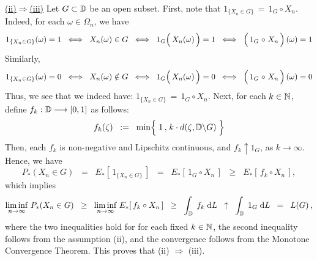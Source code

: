 \vskip 0.5cm \noindent
\underline{(ii)\;$\Longrightarrow$\;(iii)}
\vskip 0.2cm \noindent
Let $G \subset \mathbb{D}$ be an open subset.
First, note that $1_{\{X_{n} \in G\}} \,=\, 1_{G} \circ X_{n}$.
Indeed, for each $\omega \in \Omega_{n}$, we have
\begin{equation*}
1_{\{X_{n} \in G\}}(\omega) = 1
\;\;\Longleftrightarrow\;\; X_{n}(\omega) \in G
\;\;\Longleftrightarrow\;\; 1_{G}\!\left(\,X_{n}(\overset{{\color{white}-}}{\omega})\,\right) = 1
\;\;\Longleftrightarrow\;\; \left(\,1_{G} \overset{{\color{white}-}}{\circ} X_{n}\,\right)(\omega) = 1
\end{equation*}
Similarly,
\begin{equation*}
1_{\{X_{n} \in G\}}(\omega) = 0
\;\;\Longleftrightarrow\;\; X_{n}(\omega) \notin G
\;\;\Longleftrightarrow\;\; 1_{G}\!\left(\,X_{n}(\overset{{\color{white}-}}{\omega})\,\right) = 0
\;\;\Longleftrightarrow\;\; \left(\,1_{G} \overset{{\color{white}-}}{\circ} X_{n}\,\right)(\omega) = 0
\end{equation*}
Thus, we see that we indeed have: $1_{\{X_{n} \in G\}} \,=\, 1_{G} \circ X_{n}$.
Next, for each $k \in \mathbb{N}$, define $f_{k} : \mathbb{D} \longrightarrow [0,1]$ as follows:
\begin{equation*}
f_{k}(\zeta)
\;\; := \;\;
	\min\!\left\{\;1\,\overset{{\color{white}\vert}}{,}\;k \cdot d(\zeta,\D \backslash G)\;\right\}
\end{equation*}
Then, each $f_{k}$ is non-negative and Lipschitz continuous, and
$f_{k} \uparrow 1_{G}$, as $k \longrightarrow \infty$. Hence, we have
\begin{equation*}
P_{*}(X_{n} \in G)
\;\; = \;\; E_{*}\!\left[\,1_{\{X_{n} \in G\}}\,\right]
\;\; = \;\; E_{*}\!\left[\,1_{G} \circ X_{n}\,\right]
\;\; \geq \;\; E_{*}\!\left[\,f_{k} \circ X_{n}\,\right],
\end{equation*}
which implies
\begin{equation*}
\underset{n\rightarrow\infty}{\liminf}\;P_{*}(X_{n} \in G)
\;\; \geq \;\; \underset{n\rightarrow\infty}{\liminf}\;E_{*}\!\left[\,f_{k} \circ X_{n}\,\right]
\;\; \geq \;\; \int_{\mathbb{D}}\; f_{k} \;\textnormal{d} L
\;\; \uparrow \;\; \int_{\mathbb{D}}\; 1_{G} \;\textnormal{d} L
\;\; = \;\; L(G)\,,
\end{equation*}
where the two inequalities hold for for each fixed $k \in \mathbb{N}$, the second inequality follows from the assumption (ii), and
the convergence follows from the Monotone Convergence Theorem.
This proves that (ii) $\Longrightarrow$ (iii).

